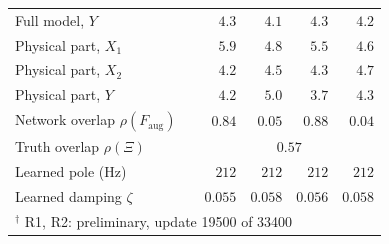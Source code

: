 \begin{tabular}{l r r r r r}
Full model, $Y$ &  & $4.3$ & $4.1$ & $4.3$ & $4.2$\\
Physical part, $X_1$ &  & $5.9$ & $4.8$ & $5.5$ & $4.6$\\
Physical part, $X_2$ &  & $4.2$ & $4.5$ & $4.3$ & $4.7$\\
Physical part, $Y$ &  & $4.2$ & $5.0$ & $3.7$ & $4.3$\\
\midrule
Network overlap $\rho(F_{\mathrm{aug}})$ &  & $0.84$ & $0.05$ & $0.88$ & $0.04$\\
Truth overlap $\rho(\Xi)$ & & \multicolumn{4}{c}{$0.57$}\\
Learned pole (Hz) &  & $212$ & $212$ & $212$ & $212$\\
Learned damping $\zeta$ &  & $0.055$ & $0.058$ & $0.056$ & $0.058$\\
\bottomrule
\multicolumn{6}{l}{\footnotesize $^\dagger$ R1, R2: preliminary, update 19500 of 33400}\\
\end{tabular}
